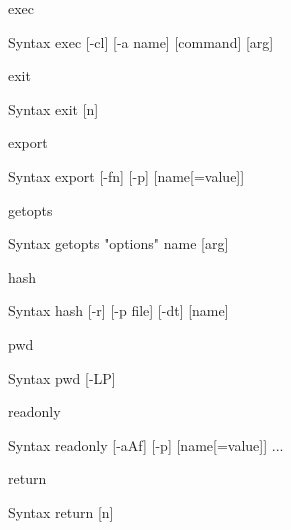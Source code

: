 \documentclass[10pt, compress, aspectratio=169]{beamer}
\begin{document}
\begin{frame}{exec}
  \begin{alertblock}{Syntax}
    exec [-cl] [-a name] [command] [arg]
  \end{alertblock}
  
\end{frame}

\begin{frame}{exit}
  \begin{alertblock}{Syntax}
    exit [n]
  \end{alertblock}
\end{frame}

\begin{frame}{export}
  \begin{alertblock}{Syntax}
    export [-fn] [-p] [name[=value]]
  \end{alertblock}
\end{frame}

\begin{frame}{getopts}
  \begin{alertblock}{Syntax}
    getopts "options" name [arg]
  \end{alertblock}
  
\end{frame}

\begin{frame}{hash}
  \begin{alertblock}{Syntax}
    hash [-r] [-p file] [-dt] [name]
  \end{alertblock}
\end{frame}

\begin{frame}{pwd}
  \begin{alertblock}{Syntax}
    pwd [-LP]
  \end{alertblock}
\end{frame}

\begin{frame}{readonly}
  \begin{alertblock}{Syntax}
    readonly [-aAf] [-p] [name[=value]] ...
  \end{alertblock}
\end{frame}

\begin{frame}{return}
  \begin{alertblock}{Syntax}
    return [n]
  \end{alertblock}
\end{frame}
\end{document}

